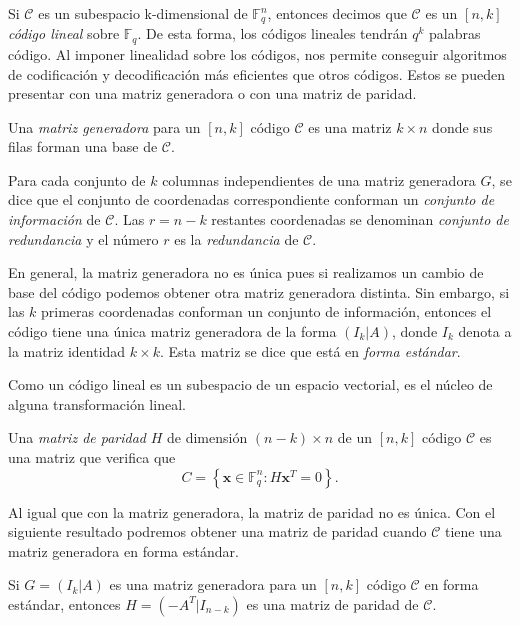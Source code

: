Si $\mathcal{C}$ es un subespacio k-dimensional de $\mathbb{F}_q^n$, entonces decimos que $\mathcal{C}$ es un $\left[ n, k \right]$ \emph{código lineal} sobre $\mathbb{F}_q$. De esta forma, los códigos lineales tendrán $q^k$ palabras código. Al imponer linealidad sobre los códigos, nos permite conseguir algoritmos de codificación y decodificación más eficientes que otros códigos. Estos se pueden presentar con una matriz generadora o con una matriz de paridad.

\begin{definition}
    Una \emph{matriz generadora} para un $\left[ n,k \right]$ código $\mathcal{C}$ es una matriz $k \times n$ donde sus filas forman una base de $\mathcal{C}$.
\end{definition}

\begin{definition}
    Para cada conjunto de $k$ columnas independientes de una matriz generadora $G$, se dice que el conjunto de coordenadas correspondiente conforman un \emph{conjunto de información} de $\mathcal{C}$. Las $r = n-k$ restantes coordenadas se denominan \emph{conjunto de redundancia} y el número $r$ es la \emph{redundancia} de $\mathcal{C}$.
\end{definition}

En general, la matriz generadora no es única pues si realizamos un cambio de base del código podemos obtener otra matriz generadora distinta. Sin embargo, si las $k$ primeras coordenadas conforman un conjunto de información, entonces el código tiene una única matriz generadora de la forma $( I_k | A)$, donde $I_k$ denota a la matriz identidad $k \times k$. Esta matriz se dice que está en \emph{forma estándar}.

Como un código lineal es un subespacio de un espacio vectorial, es el núcleo de alguna transformación lineal.

\begin{definition}
    Una \emph{matriz de paridad} $H$ de dimensión $(n-k) \times n$ de un $\left[ n,k \right]$ código $\mathcal{C}$ es una matriz que verifica que
    \[
        C = \left\lbrace \mathbf{x} \in \mathbb{F} _q^n : H\mathbf{x}^T = 0 \right\rbrace .
    \]
\end{definition}

Al igual que con la matriz generadora, la matriz de paridad no es única. Con el siguiente resultado podremos obtener una matriz de paridad cuando $\mathcal{C}$ tiene una matriz generadora en forma estándar.

\begin{theorem}
    \label{th:generadora-paridad}
    Si $G = \left( I_k | A \right)$ es una matriz generadora para un $\left[ n,k \right]$ código $\mathcal{C}$ en forma estándar, entonces $H = \left( -A^T | I_{n-k} \right)$ es una matriz de paridad de $\mathcal{C}$.
\end{theorem}

